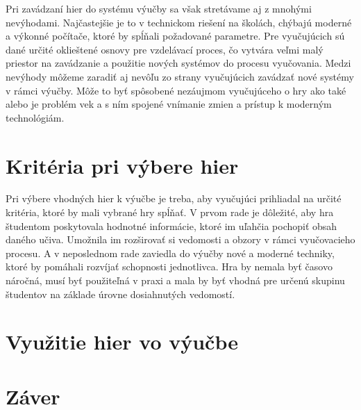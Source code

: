 \documentclass[10pt,twoside,slovak,a4paper]{article}
\begin{document}
Pri zavádzaní hier do systému výučby sa však stretávame aj z mnohými nevýhodami. Najčastejšie je to v technickom riešení na školách, chýbajú moderné a výkonné počítače, ktoré by spĺňali požadované parametre. Pre vyučujúcich sú dané určité oklieštené osnovy pre vzdelávací proces, čo vytvára veľmi malý priestor na zavádzanie a použitie nových systémov do procesu vyučovania.  Medzi nevýhody môžeme zaradiť aj nevôľu zo strany vyučujúcich zavádzať nové systémy v rámci výučby. Môže to byť spôsobené nezáujmom vyučujúceho o hry ako také alebo je problém vek a s ním spojené vnímanie zmien a prístup k moderným technológiám.

\section{Kritéria pri výbere hier}

Pri výbere vhodných hier k výučbe je treba, aby vyučujúci prihliadal na určité kritéria, ktoré by mali vybrané hry spĺňať. V prvom rade je dôležité, aby hra študentom poskytovala hodnotné informácie, ktoré im uľahčia pochopiť obsah daného učiva. Umožnila im rozširovať si vedomosti a obzory v rámci vyučovacieho procesu. A v neposlednom rade zaviedla do výučby nové a moderné techniky, ktoré by pomáhali rozvíjať schopnosti jednotlivca. Hra by nemala byť časovo náročná, musí byť použiteľná v praxi a mala by byť vhodná pre určenú skupinu študentov na základe úrovne dosiahnutých vedomostí.

\section{Využitie hier vo výučbe}

\section{Záver}



\end{document}
